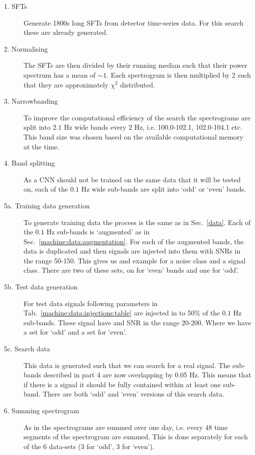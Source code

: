 \begin{description}
	\item[1. \acp{SFT}] Generate 1800s long \acp{SFT} from detector time-series data. For this search these are already generated.
	
	\item[2. Normalising] The \acp{SFT} are then divided by their running median such that their power spectrum has a mean of $\sim 1$. Each spectrogram is then multiplied by 2 such that they are approximately $\chi^{2}$ distributed.
	
	\item[3. Narrowbanding] To improve the computational efficiency of the search the spectrograms are split into 
	$2.1$ Hz wide bands every $2$ Hz,
	i.e. 100.0-102.1, 102.0-104.1 etc.
	This band size was chosen based on the available computational memory at the time.
	
	\item[4. Band splitting]  As a \ac{CNN} should not be trained on the same data that it will be tested on, each of the $0.1$ Hz wide sub-bands are split into `odd' or `even' bands. 
	
	\item[5a. Training data generation] To generate training data the
	process is the same as in Sec.~\ref{data}.  Each of the $0.1$ Hz sub-bands is `augmented' as in Sec.~\ref{machine:data:augmentation}. For each of the augmented bands, the data is duplicated and then signals are injected into them with \acp{SNR} in the range 50-150. This gives us and example for a noise class and a signal class. There are two of these sets, on for `even' bands and one for `odd'.
	
	\item[5b. Test data generation] For test data signals following parameters in Tab.~\ref{machine:data:injections:table} are injected in to 50\% of the $0.1$ Hz sub-bands. These signal have and \ac{SNR} in the range 20-200. Where we have a set for `odd' and a set for `even'.
	
	\item[5c. Search data] This data is generated such that we can search for a real signal. The sub-bands described in part 4 are now overlapping by 0.05 Hz. This means that if there is a signal it should be fully contained within at least one sub-band. There are both `odd' and `even' versions of this search data.
	
	\item[6. Summing spectrogram] As in \cite{bayley2019SOAPGeneralised} the spectrograms are summed over one day, i.e. every 48 time segments of the spectrogram are summed. This is done separately for each of the 6 data-sets (3 for `odd', 3 for `even'). 
	

\end{description}
